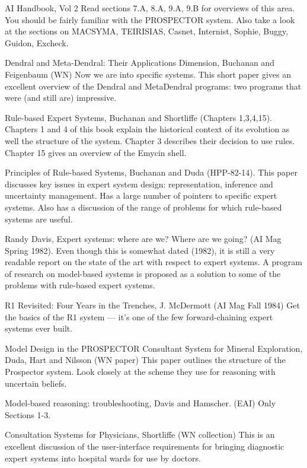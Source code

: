 \begin{required}

  \paper  AI Handbook, Vol 2
     Read sections 7.A, 8.A, 9.A, 9.B for overviews of this area.
     You should be fairly familiar with the PROSPECTOR system.  Also
     take a look at the sections on MACSYMA, TEIRISIAS, Casnet,
     Internist, Sophie, Buggy, Guidon, Excheck. 

  \paper  Dendral and Meta-Dendral: Their Applications Dimension, 
        Buchanan and Feigenbaum (WN)
     Now we are into specific systems. This short paper gives an
     excellent overview of the Dendral and MetaDendral programs:
     two programs that were (and still are) impressive. 

  \paper Rule-based Expert Systems, Buchanan and Shortliffe (Chapters
1,3,4,15).  Chapters 1 and 4 of this book explain the historical
context of its evolution as well the structure of the system.  Chapter
3 describes their decision to use rules. Chapter 15 gives an overview
of the Emycin shell.

  \paper  Principles of Rule-based Systems, Buchanan and Duda (HPP-82-14).
     This paper discusses key issues in expert system design:
     representation, inference and uncertainty management. 
     Has a large number of pointers to specific expert systems.
     Also has a discussion of the range of problems for which
     rule-based systems are useful.

  \paper Randy Davis, Expert systems: where are we? Where are we
going?  (AI Mag Spring 1982).  Even though this is somewhat dated
(1982), it is still a very readable report on the state of the art
with respect to expert systems. A program of research on model-based
systems is proposed as a solution to some of the problems with
rule-based expert systems.

  \paper  R1 Revisited: Four Years in the Trenches, J. McDermott (AI Mag Fall 1984) 
     Get the basics of the R1 system --- it's one of the few
     forward-chaining expert systems ever built.


\end{required}

\begin{optional}

  \paper  Model Design in the PROSPECTOR Consultant System for Mineral Exploration,
     Duda, Hart and Nilsson (WN paper)
     This paper outlines the structure of the Prospector system.  Look
     closely at the scheme they use for reasoning with uncertain beliefs. 

  \paper Model-based reasoning: troubleshooting, Davis and Hamscher.
(EAI) Only Sections 1-3.

  \paper  Consultation Systems for Physicians, Shortliffe (WN collection)
     This is an excellent discussion of the user-interface 
     requirements for bringing diagnostic expert systems
     into hospital wards for use by doctors.

\end{optional}

